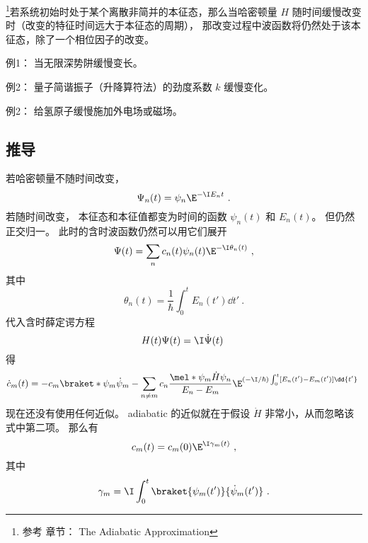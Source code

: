 

\begin{issues}
\issueDraft
\end{issues}

\footnote{参考 \cite{GriffE} 章节： The Adiabatic Approximation}若系统初始时处于某个离散非简并的本征态，那么当哈密顿量 $H$ 随时间缓慢改变时（改变的特征时间远大于本征态的周期）， 那改变过程中波函数将仍然处于该本征态，除了一个相位因子的改变。

例1： 当无限深势阱缓慢变长。

例2： 量子简谐振子（升降算符法）的劲度系数 $k$ 缓慢变化。

例2： 给氢原子缓慢施加外电场或磁场。

\subsection{推导}
若哈密顿量不随时间改变，
\begin{equation}
\Psi_n(t) = \psi_n \E^{-\I E_n t}~.
\end{equation}
若随时间改变， 本征态和本征值都变为时间的函数 $\psi_n(t)$ 和 $E_n(t)$。 但仍然正交归一。 此时的含时波函数仍然可以用它们展开
\begin{equation}
\Psi(t) = \sum_n c_n(t) \psi_n(t) \E^{-\I \theta_n(t)}~,
\end{equation}
其中
\begin{equation}
\theta_n(t) = \frac{1}{\hbar} \int_0^t E_n(t')\dd{t'}~.
\end{equation}
代入含时薛定谔方程
\begin{equation}\label{eq_AdiaQM_1}
H(t)\Psi(t) = \I \dot \Psi(t)~
\end{equation}
得
\begin{equation}
\dot c_m(t) = -c_m \braket*{\psi_m}{\dot\psi_m} - \sum_{n\ne m} c_n \frac{\mel*{\psi_m}{\dot H}{\psi_n}}{E_n-E_m} \E^{(-\I/\hbar) \int_0^t[E_n(t')-E_m(t')]\dd{t'}}~
\end{equation}
现在还没有使用任何近似。 adiabatic 的近似就在于假设 $\dot H$ 非常小，从而忽略该式中第二项。 那么有
\begin{equation}
c_m(t) = c_m(0)\E^{\I\gamma_m(t)}~,
\end{equation}
其中
\begin{equation}
\gamma_m = \I \int_0^t \braket{\psi_m(t')}{\dot\psi_m(t')}~.
\end{equation}

